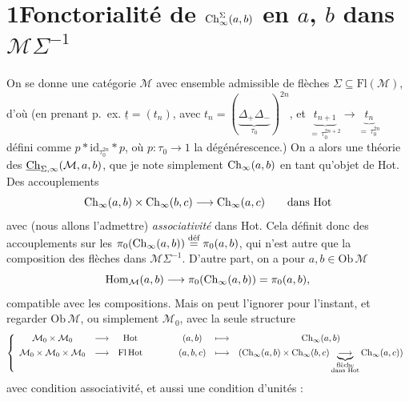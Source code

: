 \clearpage



\clearpage



\section*{1\quad Fonctorialité de $\mathrm{Ch}^{\Sigma}_{\infty}(a,b)$ en $a$, $b$ dans $\mathcal{M}\Sigma^{-1}$}

On se donne une catégorie $\mathcal{M}$ avec ensemble admissible de flèches $\Sigma \subseteq \mathrm{Fl}(\mathcal{M})$, d'où (en prenant p.~ex. $\underline{t} = (t_n)$, avec $t_n = (\underbrace{\Delta_+\Delta_-}_{\tau_0})^{2n}$, et $\underbrace{t_{n+1}}_{=\,\tau_0^{2n+2}} \longrightarrow \underbrace{t_n}_{=\,\tau_0^{2n}}$ défini comme $p * \mathrm{id}_{\tau_0^{2n}} * p$, où $p : \tau_0 \longrightarrow 1$ la dégénérescence.) On a alors une théorie des $\underline{\mathrm{Ch}}_{\Sigma,\infty}(\mathcal{M},a,b)$, que je note simplement $\mathrm{Ch}_\infty(a,b)$ en tant qu'objet de Hot. Des accouplements
\[
\mathrm{Ch}_\infty(a,b) \times \mathrm{Ch}_\infty(b,c) \longrightarrow \mathrm{Ch}_\infty(a,c) \qquad \text{dans Hot}
\]
avec (nous allons l'admettre) \textit{associativité} dans Hot. Cela définit donc des accouplements sur les $\pi_0(\mathrm{Ch}_\infty(a,b)) \overset{\text{déf}}{=} \pi_0(a,b)$, qui n'est autre que la composition des flèches dans $\mathcal{M}\Sigma^{-1}$. D'autre part, on a pour $a,b \in \mathrm{Ob}\,\mathcal{M}$
\[
\mathrm{Hom}_{\mathcal{M}}(a,b) \longrightarrow \pi_0(\mathrm{Ch}_\infty(a,b)) = \pi_0(a,b),
\]
compatible avec les compositions. Mais on peut l'ignorer pour l'instant, et regarder $\mathrm{Ob}\,\mathcal{M}$, ou simplement $\mathcal{M}_0$, avec la seule structure
\[
\left\{
\begin{array}{ccccccc}
\mathcal{M}_0 \times \mathcal{M}_0 & \longrightarrow & \mathrm{Hot} & \qquad & (a,b) & \longmapsto & \mathrm{Ch}_\infty(a,b) \\[1ex]
\mathcal{M}_0 \times \mathcal{M}_0 \times \mathcal{M}_0 & \longrightarrow & \mathrm{Fl}\,\mathrm{Hot} & \qquad & (a,b,c) & \longmapsto & (\mathrm{Ch}_\infty(a,b) \times \mathrm{Ch}_\infty(b,c) \underbrace{\longrightarrow}_{\substack{\text{flèche}\\ \text{dans Hot}}} \mathrm{Ch}_\infty(a,c))
\end{array}
\right.
\]
avec condition associativité, et aussi une condition d'unités :

